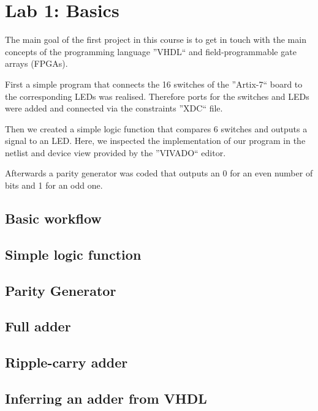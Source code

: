 \chapter{Lab 1: Basics} \label{day1}

The main goal of the first project in this course is to get in touch with the main concepts of the programming language ''VHDL`` and field-programmable gate arrays (FPGAs). 

First a simple program that connects the 16 switches of the ''Artix-7`` board to the corresponding LEDs was realised. Therefore ports for the switches and LEDs were added and connected via the constraints ''XDC`` file.

Then we created a simple logic function that compares 6 switches and outputs a signal to an LED. Here, we inspected the implementation of our program in the netlist and device view provided by the ''VIVADO`` editor.

Afterwards a parity generator was coded that outputs an 0 for an even number of bits and 1 for an odd one.


\section{Basic workflow}



\section{Simple logic function}



\section{Parity Generator}



\section{Full adder}



\section{Ripple-carry adder}



\section{Inferring an adder from VHDL}


